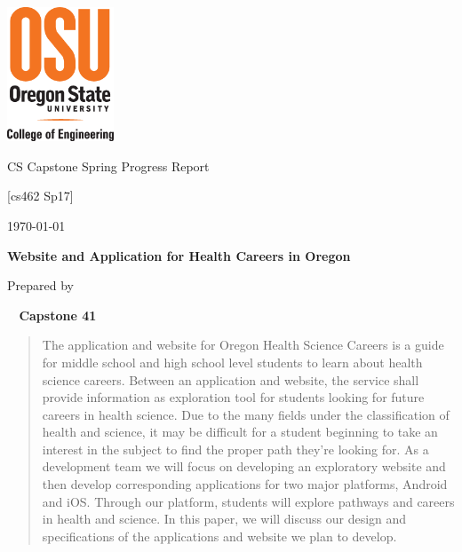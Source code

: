 \documentclass[onecolumn, draftclsnofoot,10pt, compsoc]{IEEEtran}
\def \CapstoneTeamName{		Capstone 41}
\def \CapstoneProjectName{		Website and Application for Health Careers in Oregon}
\def \DocType{	%
				Spring Progress Report
				}
\begin{document}
\begin{titlepage}
    \begin{singlespace}
    	\includegraphics[height=4cm]{coe_v_spot1}
        \hfill 
        \par\vspace{.2in}
        \centering
        \scshape{
            \huge CS Capstone \DocType \par
           	\huge [cs462 Sp17] \par
            {\large\today}\par
            \vspace{.5in}
            \textbf{\Huge\CapstoneProjectName}\par
            \vspace{.5in}
           
            {\large Prepared by }\par
           
   
            \vspace{5pt}
            \textbf{\Huge\ \CapstoneTeamName}\par
            }
            \vspace{60pt}
        
        \begin{abstract}
The application and website for Oregon Health Science Careers is a guide for middle school and high school level students to learn about health science careers.  
Between an application and website, the service shall provide information as exploration tool for students looking for future careers in health science. 
Due to the many fields under the classification of health and science, it may be difficult for a student beginning to take an interest in the subject to find the proper path they’re looking for. 
As a development team we will focus on developing an exploratory website and then develop corresponding applications for two major platforms, Android and iOS.
Through our platform, students will explore pathways and careers in health and science. 
In this paper, we will discuss our design and specifications of the applications and website we plan to develop. 
        \end{abstract} 
        
    \end{singlespace}
\end{titlepage}
\newpage
{}
\tableofcontents
\clearpage
\end{document}
